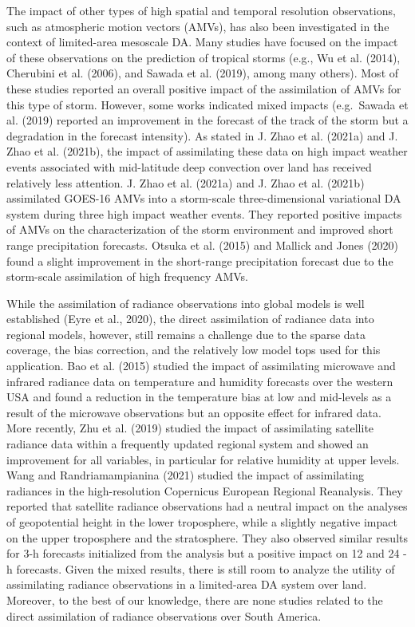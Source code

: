 \documentclass[final,5p,times,twocolumn,authoryear]{elsarticle} %
\begin{document}
The impact of other types of high spatial and temporal resolution observations, such as atmospheric motion vectors (AMVs), has also been investigated in the context of limited-area mesoscale DA. Many studies have focused on the impact of these observations on the prediction of tropical storms (e.g., Wu et al. (2014), Cherubini et al. (2006), and Sawada et al. (2019), among many others). Most of these studies reported an overall positive impact of the assimilation of AMVs for this type of storm. However, some works indicated mixed impacts (e.g.~Sawada et al. (2019) reported an improvement in the forecast of the track of the storm but a degradation in the forecast intensity). As stated in J. Zhao et al. (2021a) and J. Zhao et al. (2021b), the impact of assimilating these data on high impact weather events associated with mid-latitude deep convection over land has received relatively less attention. J. Zhao et al. (2021a) and J. Zhao et al. (2021b) assimilated GOES-16 AMVs into a storm-scale three-dimensional variational DA system during three high impact weather events. They reported positive impacts of AMVs on the characterization of the storm environment and improved short range precipitation forecasts. Otsuka et al. (2015) and Mallick and Jones (2020) found a slight improvement in the short-range precipitation forecast due to the storm-scale assimilation of high frequency AMVs.

While the assimilation of radiance observations into global models is well established (Eyre et al., 2020), the direct assimilation of radiance data into regional models, however, still remains a challenge due to the sparse data coverage, the bias correction, and the relatively low model tops used for this application. Bao et al. (2015) studied the impact of assimilating microwave and infrared radiance data on temperature and humidity forecasts over the western USA and found a reduction in the temperature bias at low and mid-levels as a result of the microwave observations but an opposite effect for infrared data. More recently, Zhu et al. (2019) studied the impact of assimilating satellite radiance data within a frequently updated regional system and showed an improvement for all variables, in particular for relative humidity at upper levels. Wang and Randriamampianina (2021) studied the impact of assimilating radiances in the high-resolution Copernicus European Regional Reanalysis. They reported that satellite radiance observations had a neutral impact on the analyses of geopotential height in the lower troposphere, while a slightly negative impact on the upper troposphere and the stratosphere. They also observed similar results for 3-h forecasts initialized from the analysis but a positive impact on 12 and 24 -h forecasts. Given the mixed results, there is still room to analyze the utility of assimilating radiance observations in a limited-area DA system over land. Moreover, to the best of our knowledge, there are none studies related to the direct assimilation of radiance observations over South America.
\end{document}
